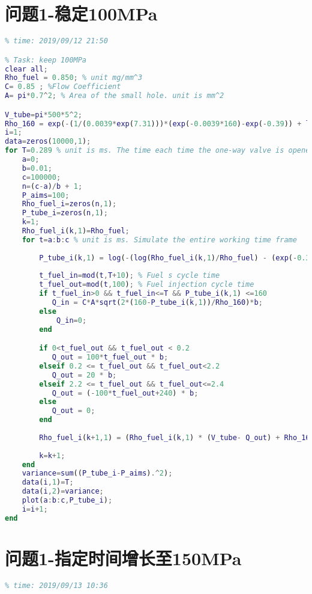\documentclass[withoutpreface,bwprint]{cumcmthesis} %
\begin{document}
\newpage
\begin{appendices}


\section{问题1-稳定100MPa}

\begin{lstlisting}[language=matlab]
% 2019_A
% time: 2019/09/12 21:50

% Task: keep 100MPa
clear all;
Rho_fuel = 0.850; % unit mg/mm^3
C= 0.85 ; %Flow Coefficient
A= pi*0.7^2; % Area of the small hole. unit is mm^2

V_tube=pi*500*5^2;
Rho_160 = exp(-(1/(0.0039*exp(7.31)))*(exp(-0.0039*160)-exp(-0.39)) + log(0.85))  ; % Fuel density at a pressure of 160 MPa
i=1;
data=zeros(10000,1);
for T=0.289 % unit is ms. The time each time the one-way valve is opened
    a=0;
    b=0.01;
    c=100000;
    n=(c-a)/b + 1;
    P_aims=100;
    Rho_fuel_i=zeros(n,1);
    P_tube_i=zeros(n,1);
    k=1;
    Rho_fuel_i(k,1)=Rho_fuel;
    for t=a:b:c % unit is ms. Simulate the entire working time frame
        
        P_tube_i(k,1) = log(-(log(Rho_fuel_i(k,1)/Rho_fuel) - (exp(-0.39)/(0.0039*exp(7.31))))*0.0039*exp(7.31))*(-1/0.0039);
        
        t_fuel_in=mod(t,T+10); % Fuel s cycle time
        t_fuel_out=mod(t,100); % Fuel injection cycle time
        if t_fuel_in>0 && t_fuel_in<=T && P_tube_i(k,1) <=160
           Q_in = C*A*sqrt(2*(160-P_tube_i(k,1))/Rho_160)*b;
        else
            Q_in=0;
        end

        if 0<t_fuel_out && t_fuel_out < 0.2 
           Q_out = 100*t_fuel_out * b;
        elseif 0.2 <= t_fuel_out && t_fuel_out<2.2
           Q_out = 20 * b;
        elseif 2.2 <= t_fuel_out && t_fuel_out<=2.4
           Q_out = (-100*t_fuel_out+240) * b;
        else
           Q_out = 0;
        end
        
        Rho_fuel_i(k+1,1) = (Rho_fuel_i(k,1) * (V_tube- Q_out) + Rho_160 * Q_in) /V_tube;
        
        k=k+1;
    end
    variance=sum((P_tube_i-P_aims).^2);
    data(i,1)=T;
    data(i,2)=variance;
    plot(a:b:c,P_tube_i);
    i=i+1;
end

\end{lstlisting}
\section{问题1-指定时间增长至150MPa} 
\begin{lstlisting}[language=matlab]
% 2019_A Q1_(2) run to 150
% time: 2019/09/13 10:36


\end{lstlisting}
\end{appendices}
\end{document}
